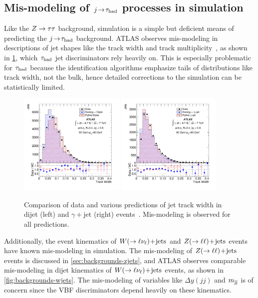 \subsection{Mis-modeling of $j\!\rightarrow\!\tau_\text{had}$ processes in simulation}

Like the $Z\rightarrow\tau\tau$ background, simulation is a simple but deficient means of predicting the $j\!\rightarrow\!\tau_\text{had}$ background. ATLAS observes mis-modeling in descriptions of jet shapes like the track width and track multiplicity~\cite{PERF-2013-02}, as shown in \cref{fig:backgrounds-trackwidth}, which $\tau_\text{had}$ jet discriminators rely heavily on. This is especially problematic for $\tau_\text{had}$ because the identification algorithms emphasize tails of distributions like track width, not the bulk, hence detailed corrections to the simulation can be statistically limited.

\begin{figure}[tp]
  \centering
  \includegraphics[width=0.45\textwidth]{figures/PERF-2013-02/figaux_01c}
  \includegraphics[width=0.45\textwidth]{figures/PERF-2013-02/figaux_02c}
  \caption{Comparison of data and various predictions of jet track width in dijet (left) and $\gamma\!+\!\text{jet}$ (right) events~\cite{PERF-2013-02}. Mis-modeling is observed for all predictions.}
  \label{fig:backgrounds-trackwidth}
\end{figure}

Additionally, the event kinematics of $W (\rightarrow \ell\nu_\ell)\!+\!\text{jets}$ and $Z (\rightarrow \ell\ell)\!+\!\text{jets}$ events have known mis-modeling in simulation. The mis-modeling of $Z (\rightarrow \ell\ell)\!+\!\text{jets}$ events is discussed in \cref{sec:backgrounds-zjets}, and ATLAS observes comparable mis-modeling in dijet kinematics of $W (\rightarrow \ell\nu_\ell)\!+\!\text{jets}$ events, as shown in \cref{fig:backgrounds-wjets}. The mis-modeling of variables like $\Delta y(jj)$ and $m_{\text{jj}}$ is of concern since the VBF discriminators depend heavily on these kinematics.


